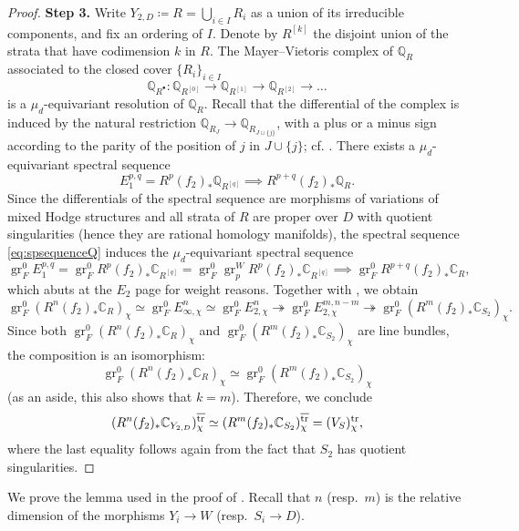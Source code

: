 \documentclass{amsart}
\newcommand{\trcon}{\mathrm{\overline{tr}}}
\theoremstyle{definition}
\theoremstyle{remark}
\def\bQ{\mathbb{Q}}
\def\bC{\mathbb{C}}
\def\gr{\operatorname{gr}}
\numberwithin{equation}{section}
\begin{document}
\begin{proof}
\textbf{Step 3.} Write $Y_{2, D} \coloneqq R = \bigcup_{i \in I} R_{i}$ as a union of its irreducible components, and fix an ordering of $I$. Denote by $R^{[k]}$ the disjoint union of the strata that have codimension $k$ in $R$. The Mayer--Vietoris complex
of $\bQ_{R}$ associated to the closed cover $\{ R_{i}\}_{i \in I}$
\begin{equation}\label{eq:resolution}
\bQ_{R^{\bullet}} \colon \bQ_{R^{[0]}} \to \bQ_{R^{[1]}} \to \bQ_{R^{[2]}} \to \dots
\end{equation}
is a $\mu_d$-equivariant resolution of $\bQ_{R}$. Recall that the differential of the complex is induced by the natural restriction $\bQ_{R_J} \to \bQ_{R_{J \cup \{j\}}}$, with a
plus or a minus sign according to the parity of the position of $j$ in $J \cup \{j\}$; cf. \cite[App.~A]{KLSV18}.
There exists a $\mu_d$-equivariant spectral sequence
\begin{equation}\label{eq:spsequenceQ}
E^{p,q}_1 = R^{p} (f_{2})_*\bQ_{R^{[q]}} \implies R^{p+q}(f_2)_*\bQ_{R}.
\end{equation}
Since the differentials of the spectral sequence 
are morphisms of variations of mixed Hodge structures and all strata of $R$ are proper over $D$  with quotient singularities (hence they are rational homology manifolds), the spectral sequence \eqref{eq:spsequenceQ} induces the $\mu_d$-equivariant spectral sequence 
\[
\gr_F^0 E^{p,q}_1 =  \gr_F^0 R^{p} (f_{2})_*\bC_{R^{[q]}} = \gr_F^0 
\gr^W_{p} 
R^{p} (f_{2})_*\bC_{R^{[q]}} 
\implies \gr^0_F R^{p+q}(f_2)_*\bC_{R}, 
\]
which abuts at the $E_2$ page for weight reasons. Together with , we obtain
\[
\gr_F^0(R^n(f_2)_*\bC_{R})_{\chi} \simeq \gr_F^0 E^{n}_{\infty, \chi} \simeq \gr_F^0 E^{n}_{2, \chi} \twoheadrightarrow \gr_F^0 E^{m,n-m}_{2, \chi} \twoheadrightarrow \gr_F^0(R^m(f_2)_*\bC_{S_2})_{\chi}.
\]
Since both $\gr_F^0(R^n(f_2)_*\bC_{R})_{\chi}$ and $\gr_F^0(R^m(f_2)_*\bC_{S_2})_{\chi}$ are line bundles, the composition is an isomorphism:
\[
\gr_F^0(R^n(f_2)_*\bC_{R})_{\chi} \simeq \gr_F^0(R^m(f_2)_*\bC_{S_2})_{\chi}
\]
(as an aside, this also shows that $k=m$). Therefore, we conclude
\begin{equation}\label{eq:lastiso}
(R^n (f_2)_* \bC_{Y_{2, D}})^{\trcon}_{\chi} \simeq (R^m (f_2)_* \bC_{S_{2}})^{\trcon}_{\chi} = (V_S)_{\chi}^{\rm tr},
\end{equation}
where the last equality follows again from the fact that $S_2$ has quotient singularities. 
\end{proof}

We prove the lemma used in the proof of . Recall that $n$ (resp.~$m$) is the relative dimension of the morphisms $Y_i \to W$ (resp.~$S_i \to D$). 
\end{document}
